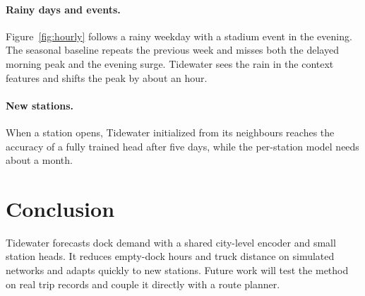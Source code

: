 \documentclass[10pt,twocolumn,letterpaper]{article}
\begin{document}
\paragraph{Rainy days and events.}
Figure~\ref{fig:hourly} follows a rainy weekday with a stadium event in the evening.
The seasonal baseline repeats the previous week and misses both the delayed morning peak and the evening surge.
Tidewater sees the rain in the context features and shifts the peak by about an hour.

\paragraph{New stations.}
When a station opens, Tidewater initialized from its neighbours reaches the accuracy of a fully trained head after five days, while the per-station model needs about a month.

\section{Conclusion}

Tidewater forecasts dock demand with a shared city-level encoder and small station heads.
It reduces empty-dock hours and truck distance on simulated networks and adapts quickly to new stations.
Future work will test the method on real trip records and couple it directly with a route planner.
\end{document}

